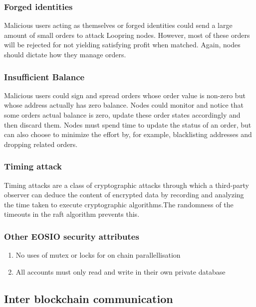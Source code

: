 \documentclass[]{article}
\begin{document}
			
		
		\subsubsection{Forged identities}
		Malicious users acting as themselves or forged identities 
		could send a large amount of small orders to attack Loopring
		nodes. However, most of these orders will be rejected 
		for not yielding satisfying profit when matched. 
		Again, nodes should dictate how they manage orders.
		
		\subsubsection{Insufficient Balance}
		Malicious users could sign and spread orders whose order 
		value is non-zero but whose address actually has zero 
		balance. Nodes could monitor and notice that some orders 
		actual balance is zero, update these order states accordingly
		and then discard them. Nodes must spend time to update
		the status of an order, but can also choose to minimize the
		effort by, for example, blacklisting addresses and dropping
		related orders.
		
		\subsubsection{Timing attack}
		 Timing attacks are a class of cryptographic attacks through which a third-party observer can deduce the content of encrypted data by recording and analyzing the time taken to execute cryptographic algorithms.The randomness of the timeouts in the raft algorithm prevents this.
		
		\subsubsection{Other EOSIO security attributes}
		\begin{enumerate}
		\item No uses of mutex or locks for on chain parallellisation
		\item All accounts must only read and write in their own private database
		\end{enumerate}
		
	\subsection{Inter blockchain communication}
	
\end{document}
